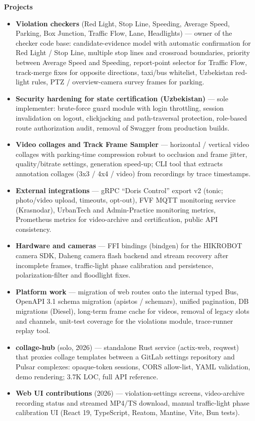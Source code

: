 \documentclass[a4paper,11pt]{article}
\newcommand{\jobpart}[1]{\vspace{4pt}\textbf{#1}\vspace{1pt}}
\newenvironment{joblist}
    {\begin{itemize}[nosep, leftmargin=1em, itemsep=2pt, label=--]}
    {\end{itemize}}
\begin{document}
\jobpart{Projects}
\begin{joblist}
\item \textbf{Violation checkers} (Red Light, Stop Line, Speeding, Average Speed, Parking, Box Junction, Traffic Flow, Lane, Headlights) --- owner of the checker code base: candidate-evidence model with automatic confirmation for Red Light / Stop Line, multiple stop lines and crossroad boundaries, priority between Average Speed and Speeding, report-point selector for Traffic Flow, track-merge fixes for opposite directions, taxi/bus whitelist, Uzbekistan red-light rules, PTZ / overview-camera survey frames for parking.
\item \textbf{Security hardening for state certification (Uzbekistan)} --- sole implementer: brute-force guard module with login throttling, session invalidation on logout, clickjacking and path-traversal protection, role-based route authorization audit, removal of Swagger from production builds.
\item \textbf{Video collages and Track Frame Sampler} --- horizontal / vertical video collages with parking-time compression robust to occlusion and frame jitter, quality/bitrate settings, generation speed-up; CLI tool that extracts annotation collages (3x3 / 4x4 / video) from recordings by trace timestamps.
\item \textbf{External integrations} --- gRPC ``Doris Control'' export v2 (tonic; photo/video upload, timeouts, opt-out), FVF MQTT monitoring service (Krasnodar), UrbanTech and Admin-Practice monitoring metrics, Prometheus metrics for video-archive and certification, public API consistency.
\item \textbf{Hardware and cameras} --- FFI bindings (bindgen) for the HIKROBOT camera SDK, Daheng camera flash backend and stream recovery after incomplete frames, traffic-light phase calibration and persistence, polarization-filter and floodlight fixes.
\item \textbf{Platform work} --- migration of web routes onto the internal typed Bus, OpenAPI 3.1 schema migration (apistos / schemars), unified pagination, DB migrations (Diesel), long-term frame cache for videos, removal of legacy slots and channels, unit-test coverage for the violations module, trace-runner replay tool.
\item \textbf{collage-hub} (solo, 2026) --- standalone Rust service (actix-web, reqwest) that proxies collage templates between a GitLab settings repository and Pulsar complexes: opaque-token sessions, CORS allow-list, YAML validation, demo rendering; 3.7K LOC, full API reference.
\item \textbf{Web UI contributions} (2026) --- violation-settings screens, video-archive recording status and streamed MP4/TS download, manual traffic-light phase calibration UI (React 19, TypeScript, Reatom, Mantine, Vite, Bun tests).
\end{joblist}
\end{document}

